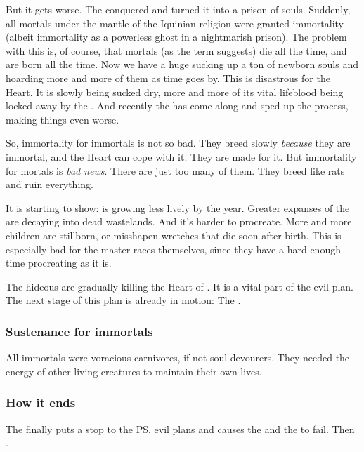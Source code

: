 But it gets worse. 
The \banelords{} conquered \iquin{} and turned it into a prison of souls. 
Suddenly, all mortals under the mantle of the Iquinian religion were granted immortality (albeit immortality as a powerless ghost in a nightmarish prison). 
The problem with this is, of course, that mortals (as the term suggests) die all the time, and are born all the time. 
Now we have a huge  sucking up a ton of newborn souls and hoarding more and more of them as time goes by. 
This is disastrous for the Heart. 
It is slowly being sucked dry, more and more of its vital lifeblood being locked away by the \sephiroth. 
And recently the  has come along and sped up the process, making things even worse. 

So, immortality for immortals is not so bad. 
They breed slowly \emph{because} they are immortal, and the Heart can cope with it. 
They are made for it. 
But immortality for mortals is \emph{bad news}. 
There are just too many of them.
They breed like rats and ruin everything. 

It is starting to show: 
\Miith{} is growing less lively by the year. 
Greater expanses of the \Wylde{} are decaying into dead wastelands. 
And it's harder to procreate. 
More and more children are stillborn, or misshapen wretches that die soon after birth. 
This is especially bad for the master races themselves, since they have a hard enough time procreating as it is. 

The hideous \sephiroth{} are gradually killing the Heart of \Miith{}. 
It is a vital part of the \psp{\banelords}{} evil plan. 
The next stage of this plan is already in motion: 
The . 





\subsubsection{Sustenance for immortals}
All immortals were voracious carnivores, if not soul-devourers. 
They needed the energy of other living creatures to maintain their own lives. 





\subsubsection{How it ends}
The  finally puts a stop to the \ps{\banes}{} evil plans and causes the \sephiroth{} and the \Morbus{} to fail. 
Then . 









